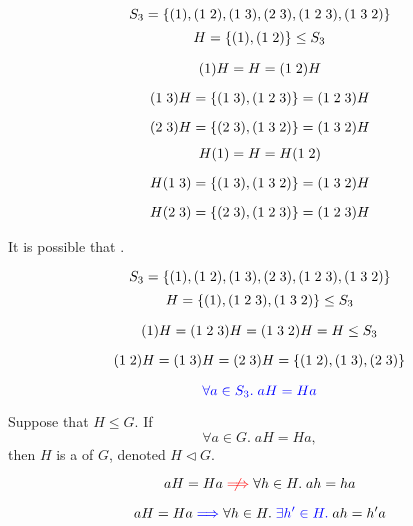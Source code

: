 
\begin{frame}
  \[
    S_{3} = \{(1), (1\; 2), (1\; 3), (2\; 3), (1\; 2\; 3), (1\; 3\; 2)\}
  \]
  \[
    H = \{(1), (1\; 2)\} \le S_{3}
  \]

  \pause
  \vspace{-0.50cm}
  \begin{gather*}
    (1) H = H = (1\; 2) H \\[6pt]
    (1\; 3) H = \{(1\; 3), (1\; 2\; 3)\} = (1\; 2\; 3)H \\[6pt]
    (2\; 3) H = \{(2\; 3), (1\; 3\; 2)\} = (1\; 3\; 2)H
  \end{gather*}
  \pause
  \vspace{-0.80cm}
  \begin{gather*}
    H(1) = H = H (1\; 2) \\[6pt]
    H(1\; 3) = \{(1\; 3), (1\; 3\; 2)\} = (1\; 3\; 2)H \\[6pt]
    H(2\; 3) = \{(2\; 3), (1\; 2\; 3)\} = (1\; 2\; 3)H
  \end{gather*}

  \pause
  \vspace{0.10cm}
  \begin{center}
    It is possible that .
  \end{center}
\end{frame}

\begin{frame}
  \[
    S_{3} = \{(1), (1\; 2), (1\; 3), (2\; 3), (1\; 2\; 3), (1\; 3\; 2)\}
  \]
  \[
    H = \{(1), (1\; 2\; 3), (1\; 3\; 2)\} \le S_{3}
  \]

  \pause
  \begin{gather*}
    (1)H = (1\;2\;3)H = (1\;3\;2)H = H \le S_{3} \\[6pt]
    (1\;2) H = (1\;3)H = (2\;3)H = \{(1\;2), (1\;3), (2\;3)\}
  \end{gather*}

  \pause
  \[
    \textcolor{blue}{\forall a \in S_{3}.\; aH = Ha}
  \]
\end{frame}

\begin{frame}
  \begin{definition}
    Suppose that $H \le G$. If
    \[
      \forall a \in G.\; aH = Ha,
    \]
    then $H$ is a  of $G$, denoted $H \triangleleft G$.
  \end{definition}

  \pause
  \[
    aH = Ha \red{\centernot\implies} \forall h \in H.\; ah = ha
  \]

  \pause
  \[
    aH = Ha \textcolor{blue}{\implies} \forall h \in H.\; \textcolor{blue}{\exists h' \in H.\;} ah = h'a
  \]
\end{frame}

